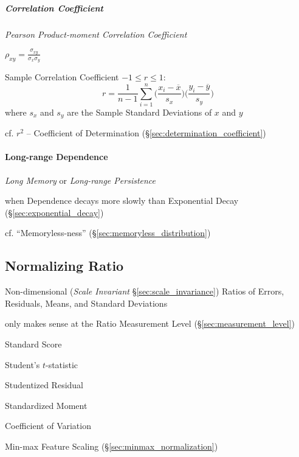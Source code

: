 \subparagraph{Correlation Coefficient}\label{sec:correlation_coefficient}\hfill

\emph{Pearson Product-moment Correlation Coefficient}

$\rho_{xy} = \frac{\sigma_{xy}}{\sigma_x \sigma_y}$

Sample Correlation Coefficient $-1 \leq r \leq 1$:
\[
  r = \frac{1}{n-1} \sum_{i=1}^n
    \Big(\frac{x_i - \overline{x}}{s_x}\Big)
    \Big(\frac{y_i - \overline{y}}{s_y}\Big)
\]
where $s_x$ and $s_y$ are the Sample Standard Deviations of $x$ and $y$

\fist cf. $r^2$ -- Coefficient of
Determination (\S\ref{sec:determination_coefficient})



\paragraph{Long-range Dependence}\label{sec:long_range_dependence}\hfill

\emph{Long Memory} or \emph{Long-range Persistence}

when Dependence decays more slowly than Exponential Decay
(\S\ref{sec:exponential_decay})

cf. ``Memoryless-ness'' (\S\ref{sec:memoryless_distribution})



\subsection{Normalizing Ratio}\label{sec:normalizing_ratio}

Non-dimensional (\emph{Scale Invariant} \S\ref{sec:scale_invariance}) Ratios of
Errors, Residuals, Means, and Standard Deviations

only makes sense at the Ratio Measurement Level (\S\ref{sec:measurement_level})

Standard Score

Student's $t$-statistic

Studentized Residual

Standardized Moment

Coefficient of Variation

Min-max Feature Scaling (\S\ref{sec:minmax_normalization})



